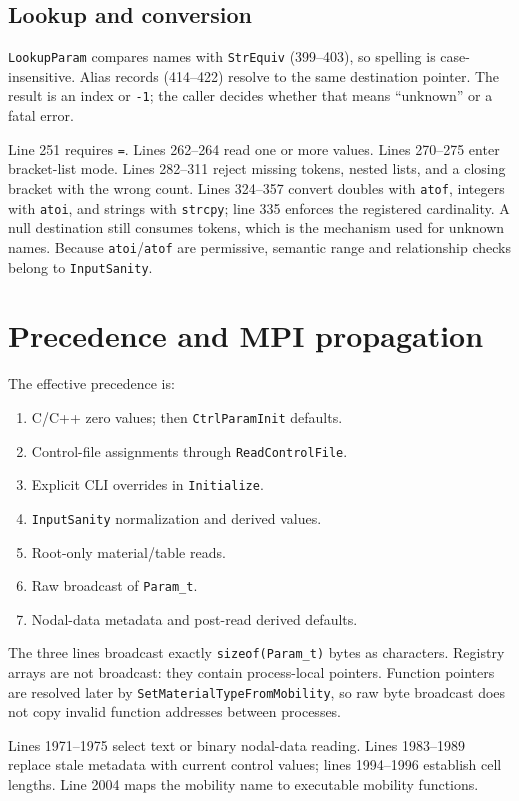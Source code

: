 \documentclass[11pt]{article}
\newcommand{\code}[1]{\texorpdfstring{\nolinkurl{#1}}{#1}}
\begin{document}
\subsection{Lookup and conversion}

\code{LookupParam} compares names with \code{StrEquiv} (399--403), so spelling is case-insensitive. Alias records (414--422) resolve to the same destination pointer. The result is an index or \code{-1}; the caller decides whether that means “unknown” or a fatal error.

Line 251 requires \code{=}. Lines 262--264 read one or more values. Lines 270--275 enter bracket-list mode. Lines 282--311 reject missing tokens, nested lists, and a closing bracket with the wrong count. Lines 324--357 convert doubles with \code{atof}, integers with \code{atoi}, and strings with \code{strcpy}; line 335 enforces the registered cardinality. A null destination still consumes tokens, which is the mechanism used for unknown names. Because \code{atoi}/\code{atof} are permissive, semantic range and relationship checks belong to \code{InputSanity}.

\section{Precedence and MPI propagation}
The effective precedence is:
\begin{enumerate}
\item C/C++ zero values; then \code{CtrlParamInit} defaults.
\item Control-file assignments through \code{ReadControlFile}.
\item Explicit CLI overrides in \code{Initialize}.
\item \code{InputSanity} normalization and derived values.
\item Root-only material/table reads.
\item Raw broadcast of \code{Param_t}.
\item Nodal-data metadata and post-read derived defaults.
\end{enumerate}

The three lines broadcast exactly \code{sizeof(Param_t)} bytes as characters. Registry arrays are not broadcast: they contain process-local pointers. Function pointers are resolved later by \code{SetMaterialTypeFromMobility}, so raw byte broadcast does not copy invalid function addresses between processes.

Lines 1971--1975 select text or binary nodal-data reading. Lines 1983--1989 replace stale metadata with current control values; lines 1994--1996 establish cell lengths. Line 2004 maps the mobility name to executable mobility functions.
\end{document}
